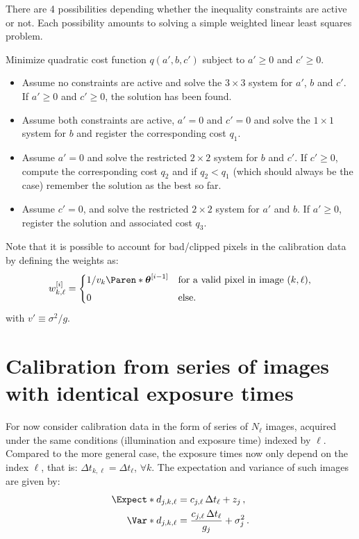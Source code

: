 \documentclass[a4paper,11pt,twoside]{scrartcl}
\newcommand*{\V}[1]{\boldsymbol{#1}}   %
\theoremstyle{plain} %
\theoremstyle{definition}
\theoremstyle{remark}
\begin{document}
There are 4 possibilities depending whether the inequality constraints are
active or not.  Each possibility amounts to solving a simple weighted linear
least squares problem.


Minimize quadratic cost function $q(a',b,c')$ subject to $a'≥0$ and $c'≥0$.
\begin{itemize}
  \item Assume no constraints are active and solve the $3\times3$ system for
  $a'$, $b$ and $c'$. If $a'≥0$ and $c'≥0$, the solution has been found.

  \item Assume both constraints are active, $a'=0$ and $c'=0$ and solve the
  $1\times1$ system for $b$ and register the corresponding cost $q_1$.

  \item Assume $a'= 0$ and solve the restricted $2\times2$ system for
  $b$ and $c'$.  If $c'≥0$, compute the  corresponding cost $q_2$ and if $q_2
  < q_1$ (which should always be the case) remember the solution as the best
  so far.

  \item Assume $c'= 0$, and solve the restricted $2\times2$ system for
  $a'$ and $b$. If $a'≥0$, register the solution and associated cost $q_3$.
\end{itemize}

Note that it is possible to account for bad/clipped pixels in the calibration
data
by defining the weights as:
\begin{equation}
  w_{k,\ell}^{[i]} = \begin{cases}
  1/v_{k}\Paren*{\V\theta^{[i-1]}}
  & \text{for a valid pixel in image $(k,\ell)$,} \\[1ex]
  0 & \text{else.}
  \end{cases}
\end{equation}
with $v'\equiv\sigma^2/g$.

\color{black}

\section{Calibration from series of images with identical exposure times}

For now consider calibration data in the form of series of $N_\ell$ images,
acquired under the same conditions (illumination and exposure time) indexed by
$\ell$.  Compared to the more general case, the exposure times now only depend
on the index $\ell$, that is: $\Delta t_{k,\ell} = \Delta t_{\ell}$, $\forall
k$.  The expectation and variance of such images are given by:
\begin{align}
  \Expect*{d_{j,k,\ell}} &= c_{j,\ell}\,\Delta t_{\ell} + z_j \,,\\
  \Var*{d_{j,k,\ell}}
  &= \frac{c_{j,\ell}\,\Delta t_{\ell}}{g_j} + \sigma_j^2 \,.
\end{align}
\end{document}
